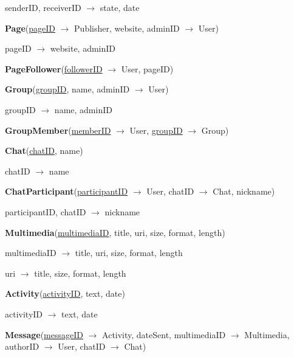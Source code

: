 \documentclass[12pt]{report}
\begin{document}
senderID, receiverID $\rightarrow$ state, date

\vspace{2mm}

\textbf{Page}(\underline{pageID} $\rightarrow$ Publisher, website, adminID $\rightarrow$ User)

pageID $\rightarrow$ website, adminID

\vspace{2mm}

\textbf{PageFollower}(\underline{followerID} $\rightarrow$ User, pageID)

\vspace{2mm}

\textbf{Group}(\underline{groupID}, name, adminID $\rightarrow$ User)

groupID $\rightarrow$ name, adminID

\vspace{2mm}

\textbf{GroupMember}(\underline{memberID} $\rightarrow$ User, \underline{groupID} $\rightarrow$ Group)

\vspace{2mm}

\textbf{Chat}(\underline{chatID}, name)

chatID $\rightarrow$ name

\vspace{2mm}

\textbf{ChatParticipant}(\underline{participantID} $\rightarrow$ User, chatID $\rightarrow$ Chat, nickname)

participantID, chatID $\rightarrow$ nickname

\vspace{2mm}

\textbf{Multimedia}(\underline{multimediaID}, title, uri, size, format, length)

multimediaID $\rightarrow$ title, uri, size, format, length

uri $\rightarrow$ title, size, format, length

\vspace{2mm}

\textbf{Activity}(\underline{activityID}, text, date)

activityID $\rightarrow$ text, date

\vspace{2mm}

\textbf{Message}(\underline{messageID} $\rightarrow$ Activity, dateSent, multimediaID $\rightarrow$ Multimedia, authorID $\rightarrow$ User, chatID $\rightarrow$ Chat)
\end{document}
